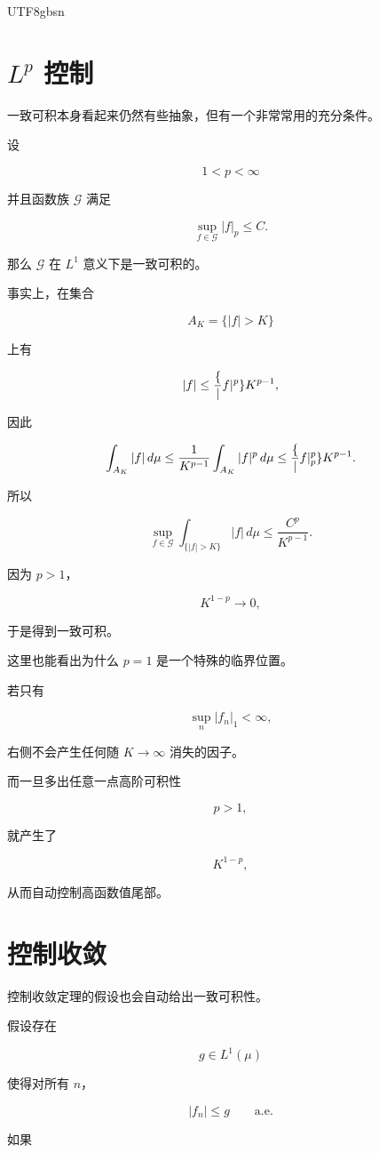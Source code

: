 \documentclass[11pt]{article}
\begin{document}
\begin{CJK*}{UTF8}{gbsn}
\section{$L^p$ 控制}


一致可积本身看起来仍然有些抽象，但有一个非常常用的充分条件。

设

\[
1<p<\infty
\]

并且函数族 $\mathcal G$ 满足

\[
\sup_{f\in\mathcal G}|f|_p\leq C.
\]

那么 $\mathcal G$ 在 $L^1$ 意义下是一致可积的。

事实上，在集合

\[
A_K=\{|f|>K\}
\]

上有

\[
|f|
\leq
\frac\{|f|^p\}{K^{p-1}},
\]

因此

\[
\int_{A_K}|f|\,d\mu
\leq
\frac1{K^{p-1}}
\int_{A_K}|f|^p\,d\mu
\leq
\frac\{|f|_p^p\}{K^{p-1}}.
\]

所以

\[
\sup_{f\in\mathcal G}
\int_{\{|f|>K\}}|f|\,d\mu
\leq
\frac{C^p}{K^{p-1}}.
\]

因为 $p>1$，

\[
K^{1-p}\to0,
\]

于是得到一致可积。

这里也能看出为什么 $p=1$ 是一个特殊的临界位置。

若只有

\[
\sup_n|f_n|_1<\infty,
\]

右侧不会产生任何随 $K\to\infty$ 消失的因子。

而一旦多出任意一点高阶可积性

\[
p>1,
\]

就产生了

\[
K^{1-p},
\]

从而自动控制高函数值尾部。


\section{控制收敛}


控制收敛定理的假设也会自动给出一致可积性。

假设存在

\[
g\in L^1(\mu)
\]

使得对所有 $n$，

\[
|f_n|\leq g
\qquad\text{a.e.}
\]

如果


\end{CJK*}
\end{document}
